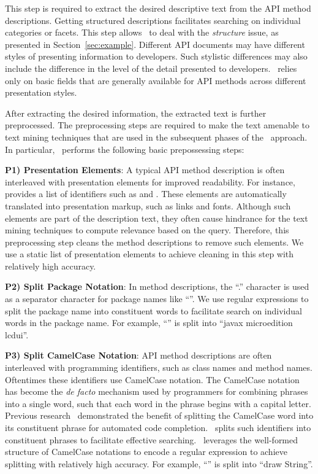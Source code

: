 This step is required to extract the desired descriptive text from the API method descriptions.
Getting structured descriptions facilitates searching on individual categories or facets.
This step allows \tool\ to deal with the \textit{structure} issue, as presented in Section~\ref{sec:example}.
Different API documents may have different styles of presenting information to developers.
Such stylistic differences may also include the difference in the level of the detail presented to developers.
\tool\ relies only on basic fields that are generally available for API methods across different presentation styles. 

After extracting the desired information, the extracted text is further preprocessed.
The preprocessing steps are required to make the text amenable to text mining techniques
that are used in the subsequent phases of the \tool\ approach.
In particular, \tool\ performs the following basic prepossessing steps: 

\textbf{P1) Presentation Elements}: A typical API method description is often interleaved with presentation elements for improved readability. For instance,  provides a list of identifiers such as   and  . These elements are automatically translated into presentation markup, such as links and fonts. Although such elements are part of the description text, they often cause hindrance for the text mining techniques to compute relevance based on the query. Therefore, this preprocessing step cleans the method descriptions to remove such elements. We use a static list of presentation elements to achieve cleaning in this step with relatively high accuracy.
	
\textbf{P2) Split Package Notation}: In method descriptions, the ``.'' character is used as a separator character for package names like ``''. We use regular expressions to split the package name into constituent words to facilitate search on individual words in the package name. For example, ``'' is split into ``javax microedition lcdui''.

\textbf{P3) Split CamelCase Notation}: API method descriptions are often interleaved with programming identifiers, such as class names and method names.
Oftentimes these identifiers use CamelCase notation.
The CamelCase notation has become the \textit{de facto} mechanism used by programmers for combining phrases into a single word, such that each word in the phrase begins with a capital letter.
Previous research~\cite{Little2009} demonstrated the benefit of splitting the CamelCase word into its constituent phrase for automated code completion.
\tool\ splits such identifiers into constituent phrases to facilitate effective searching.
\tool\ leverages the well-formed structure of CamelCase notations to encode a regular expression to achieve splitting with relatively high accuracy.
For example, ``'' is split into ``draw String''.   

